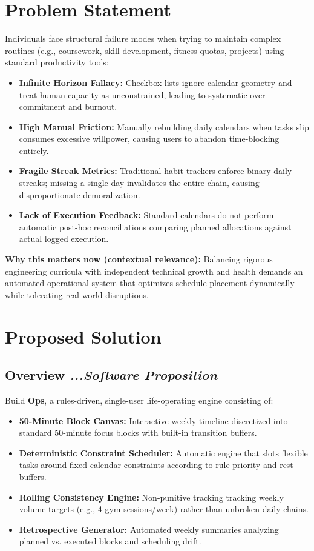 \documentclass[11pt,a4paper]{article}
\begin{document}
\section{Problem Statement}
Individuals face structural failure modes when trying to maintain complex routines (e.g., coursework, skill development, fitness quotas, projects) using standard productivity tools:
\begin{itemize}
    \item \textbf{Infinite Horizon Fallacy:} Checkbox lists ignore calendar geometry and treat human capacity as unconstrained, leading to systematic over-commitment and burnout.
    \item \textbf{High Manual Friction:} Manually rebuilding daily calendars when tasks slip consumes excessive willpower, causing users to abandon time-blocking entirely.
    \item \textbf{Fragile Streak Metrics:} Traditional habit trackers enforce binary daily streaks; missing a single day invalidates the entire chain, causing disproportionate demoralization.
    \item \textbf{Lack of Execution Feedback:} Standard calendars do not perform automatic post-hoc reconciliations comparing planned allocations against actual logged execution.
\end{itemize}
\textbf{Why this matters now (contextual relevance):} Balancing rigorous engineering curricula with independent technical growth and health demands an automated operational system that optimizes schedule placement dynamically while tolerating real-world disruptions.

\section{Proposed Solution}
\subsection{Overview \textit{...Software Proposition}}
Build \textbf{Ops}, a rules-driven, single-user life-operating engine consisting of:
\begin{itemize}
    \item \textbf{50-Minute Block Canvas:} Interactive weekly timeline discretized into standard 50-minute focus blocks with built-in transition buffers.
    \item \textbf{Deterministic Constraint Scheduler:} Automatic engine that slots flexible tasks around fixed calendar constraints according to rule priority and rest buffers.
    \item \textbf{Rolling Consistency Engine:} Non-punitive tracking tracking weekly volume targets (e.g., 4 gym sessions/week) rather than unbroken daily chains.
    \item \textbf{Retrospective Generator:} Automated weekly summaries analyzing planned vs. executed blocks and scheduling drift.
\end{itemize}
\end{document}
